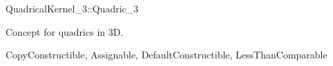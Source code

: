 
\begin{ccRefConcept}{QuadricalKernel_3::Quadric_3}

Concept for quadrics in 3D.

\ccRefines
CopyConstructible, Assignable, DefaultConstructible, LessThanComparable


\ccSeeAlso


\end{ccRefConcept}
